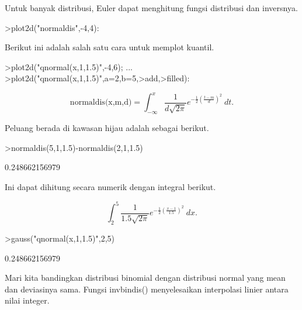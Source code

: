 \documentclass[a4paper,10pt]{article}
\begin{document}
\begin{eulernotebook}
\begin{eulercomment}
\begin{eulercomment}
\begin{eulercomment}
Untuk banyak distribusi, Euler dapat menghitung fungsi distribusi dan
inversnya.
\end{eulercomment}
\begin{eulerprompt}
>plot2d("normaldis",-4,4): 
\end{eulerprompt}
\begin{eulercomment}
Berikut ini adalah salah satu cara untuk memplot kuantil.
\end{eulercomment}
\begin{eulerprompt}
>plot2d("qnormal(x,1,1.5)",-4,6);  ...
>plot2d("qnormal(x,1,1.5)",a=2,b=5,>add,>filled):
\end{eulerprompt}
\begin{eulerformula}
\[
\text{normaldis(x,m,d)}=\int_{-\infty}^x \frac{1}{d\sqrt{2\pi}}e^{-\frac{1}{2}(\frac{t-m}{d})^2}\ dt.
\]
\end{eulerformula}
\begin{eulercomment}
Peluang berada di kawasan hijau adalah sebagai berikut.
\end{eulercomment}
\begin{eulerprompt}
>normaldis(5,1,1.5)-normaldis(2,1,1.5)
\end{eulerprompt}
\begin{euleroutput}
  0.248662156979
\end{euleroutput}
\begin{eulercomment}
Ini dapat dihitung secara numerik dengan integral berikut.\\
\end{eulercomment}
\begin{eulerformula}
\[
\int_2^5 \frac{1}{1.5\sqrt{2\pi}}e^{-\frac{1}{2}(\frac{x-1}{1.5})^2}\ dx.
\]
\end{eulerformula}
\begin{eulerprompt}
>gauss("qnormal(x,1,1.5)",2,5)
\end{eulerprompt}
\begin{euleroutput}
  0.248662156979
\end{euleroutput}
\begin{eulercomment}
Mari kita bandingkan distribusi binomial dengan distribusi normal yang
mean dan deviasinya sama. Fungsi invbindis() menyelesaikan interpolasi
linier antara nilai integer.
\end{eulercomment}
\begin{eulerprompt}

\end{eulerprompt}
\end{eulercomment}
\end{eulercomment}
\end{eulernotebook}
\end{document}
